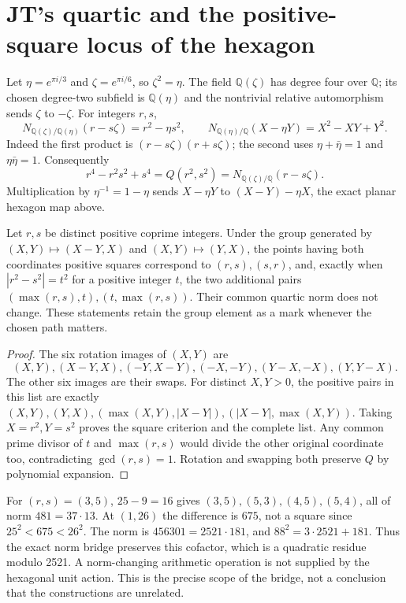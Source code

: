 \section{JT's quartic and the positive-square locus of the hexagon}
Let $\eta=e^{\pi i/3}$ and $\zeta=e^{\pi i/6}$, so $\zeta^2=\eta$.
The field $\mathbb Q(\zeta)$ has degree four over $\mathbb Q$; its
chosen degree-two subfield is $\mathbb Q(\eta)$ and the nontrivial relative
automorphism sends $\zeta$ to $-\zeta$. For integers $r,s$,
\[
 N_{\mathbb Q(\zeta)/\mathbb Q(\eta)}(r-s\zeta)=r^2-\eta s^2,
 \qquad
 N_{\mathbb Q(\eta)/\mathbb Q}(X-\eta Y)=X^2-XY+Y^2.
\]
Indeed the first product is $(r-s\zeta)(r+s\zeta)$; the second uses
$\eta+\bar\eta=1$ and $\eta\bar\eta=1$. Consequently
\[
 r^4-r^2s^2+s^4=Q(r^2,s^2)
 =N_{\mathbb Q(\zeta)/\mathbb Q}(r-s\zeta).
\]
Multiplication by $\eta^{-1}=1-\eta$ sends
$X-\eta Y$ to $(X-Y)-\eta X$, the exact planar hexagon map above.

\begin{proposition}
Let $r,s$ be distinct positive coprime integers. Under the group generated
by $(X,Y)\mapsto(X-Y,X)$ and $(X,Y)\mapsto(Y,X)$, the points having
both coordinates positive squares correspond to $(r,s),(s,r)$, and,
exactly when $|r^2-s^2|=t^2$ for a positive integer $t$, the two additional
pairs $(\max(r,s),t),(t,\max(r,s))$. Their common quartic norm does not
change. These statements retain the group element as a mark whenever the
chosen path matters.
\end{proposition}
\begin{proof}
The six rotation images of $(X,Y)$ are
\[
 (X,Y),(X-Y,X),(-Y,X-Y),(-X,-Y),(Y-X,-X),(Y,Y-X).
\]
The other six images are their swaps. For distinct $X,Y>0$, the positive
pairs in this list are exactly
$(X,Y),(Y,X),(\max(X,Y),|X-Y|),(|X-Y|,\max(X,Y))$.
Taking $X=r^2,Y=s^2$ proves the square criterion and the complete list.
Any common prime divisor of $t$ and $\max(r,s)$ would divide the other
original coordinate too, contradicting $\gcd(r,s)=1$.
Rotation and swapping both preserve $Q$ by polynomial expansion.
\end{proof}
For $(r,s)=(3,5)$, $25-9=16$ gives $(3,5),(5,3),(4,5),(5,4)$,
all of norm $481=37\cdot13$. At $(1,26)$ the difference is $675$,
not a square since $25^2<675<26^2$. The norm is
$456301=2521\cdot181$, and $88^2=3\cdot2521+181$.
Thus the exact norm bridge preserves this cofactor, which is a quadratic
residue modulo 2521. A norm-changing arithmetic operation is not supplied
by the hexagonal unit action. This is the precise scope of the bridge,
not a conclusion that the constructions are unrelated.
